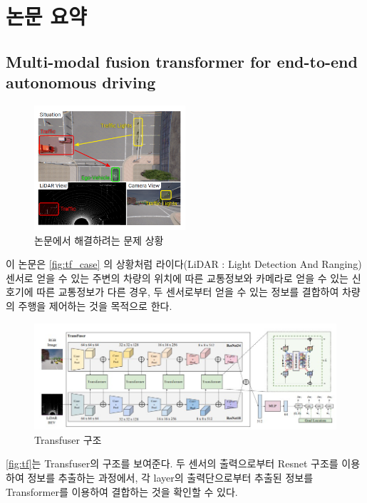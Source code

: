 \section{논문 요약}{\label{sec:review}}

\subsection{Multi-modal fusion transformer for end-to-end autonomous driving}{\label{subsec:Transfuser}}
\begin{figure}[htp]
    \centering
    \includegraphics[width=0.5\textwidth]{figures/Transfuser_case.png}
    \caption{논문에서 해결하려는 문제 상황}
    \label{fig:tf_case}
\end{figure}
이 논문은 \autoref{fig:tf_case} 의 상황처럼
라이다(LiDAR : Light Detection And Ranging) 센서로 얻을 수 있는 주변의 차량의 위치에 따른 교통정보와
카메라로 얻을 수 있는 신호기에 따른 교통정보가 다른 경우,
두 센서로부터 얻을 수 있는 정보를 결합하여 차량의 주행을 제어하는 것을 목적으로 한다.
\begin{figure}[htp]
    \centering
    \includegraphics[width=\textwidth]{figures/Transfuser.png}
    \caption{Transfuser 구조}
    \label{fig:tf}
\end{figure}
\autoref{fig:tf}는 Transfuser의 구조를 보여준다.
두 센서의 출력으로부터 Resnet 구조\cite{Resnet}를 이용하여 정보를 추출하는 과정에서,
각 layer의 출력단으로부터 추출된 정보를 Transformer\cite{Transformer}를 이용하여 결합하는 것을 확인할 수 있다.


